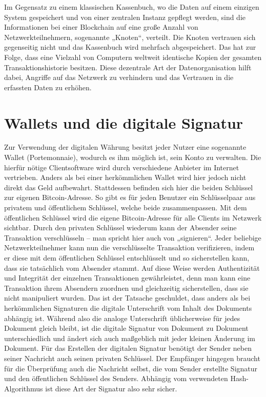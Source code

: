 \documentclass[12pt]{article}
\begin{document}
Im Gegensatz zu einem klassischen Kassenbuch, wo die Daten auf einem einzigen System gespeichert und von einer zentralen Instanz gepflegt werden, sind die Informationen bei einer Blockchain auf eine große Anzahl von Netzwerkteilnehmern, sogenannte „Knoten“, verteilt. Die Knoten vertrauen sich gegenseitig nicht und das Kassenbuch wird mehrfach abgespeichert. Das hat zur Folge, dass eine Vielzahl von Computern weltweit identische Kopien der gesamten Transaktionshistorie besitzen. Diese dezentrale Art der Datenorganisation hilft dabei, Angriffe auf das Netzwerk zu verhindern und das Vertrauen in die erfassten Daten zu erhöhen.

\section{Wallets und die digitale Signatur}
Zur Verwendung der digitalen Währung besitzt jeder Nutzer eine sogenannte Wallet (Portemonnaie), wodurch es ihm möglich ist, sein Konto zu verwalten. Die hierfür nötige Clientsoftware wird durch verschiedene Anbieter im Internet vertrieben. Anders als bei einer herkömmlichen Wallet wird hier jedoch nicht direkt das Geld aufbewahrt. Stattdessen befinden sich hier die beiden Schlüssel zur eigenen Bitcoin-Adresse. So gibt es für jeden Benutzer ein Schlüsselpaar aus privatem und öffentlichem Schlüssel, welche beide zusammenpassen. Mit dem öffentlichen Schlüssel wird die eigene Bitcoin-Adresse für alle Clients im Netzwerk sichtbar. Durch den privaten Schlüssel wiederum kann der Absender seine Transaktion verschlüsseln – man spricht hier auch von „signieren“. Jeder beliebige Netzwerkteilnehmer kann nun die verschlüsselte Transaktion verifizieren, indem er diese mit dem öffentlichen Schlüssel entschlüsselt und so sicherstellen kann, dass sie tatsächlich vom Absender stammt. Auf diese Weise werden Authentizität und Integrität der einzelnen Transaktionen gewährleistet, denn man kann eine Transaktion ihrem Absendern zuordnen und gleichzeitig sicherstellen, dass sie nicht manipuliert wurden. Das ist der Tatsache geschuldet, dass anders als bei herkömmlichen Signaturen die digitale Unterschrift vom Inhalt des Dokuments abhängig ist. Während also die analoge Unterschrift üblicherweise für jedes Dokument gleich bleibt, ist die digitale Signatur von Dokument zu Dokument unterschiedlich und ändert sich auch maßgeblich mit jeder kleinen Änderung im Dokument. Für das Erstellen der digitalen Signatur benötigt der Sender neben seiner Nachricht auch seinen privaten Schlüssel. Der Empfänger hingegen braucht für die Überprüfung auch die Nachricht selbst, die vom Sender erstellte Signatur und den öffentlichen Schlüssel des Senders. Abhängig vom verwendeten Hash-Algorithmus ist diese Art der Signatur also sehr sicher.\\
\end{document}
